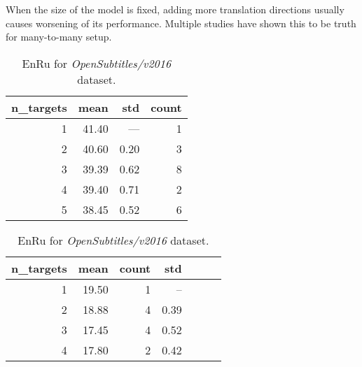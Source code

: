 When the size of the model is fixed, adding more translation directions usually causes
worsening of its performance. Multiple studies have shown this to be truth for
many-to-many setup.



\begin{table}[h!]
\begin{subtable}[t]{0.45\linewidth}
	\centering
	\begin{tabular}{rrrr}
	\toprule
	n\_targets &   mean &   std & count \\
	\midrule
	         1 &  41.40 &  ---  &   1 \\
	         2 &  40.60 &  0.20 &   3 \\
	         3 &  39.39 &  0.62 &   8 \\
	         4 &  39.40 &  0.71 &   2 \\
	         5 &  38.45 &  0.52 &   6 \\
	\bottomrule
	\end{tabular}

	\caption{
		En\to{}Bg for \emph{Europarl/v7} dataset.
		}
	\label{tab:bg/Europarl/v7}
\end{subtable}
\begin{subtable}[t]{0.45\linewidth}
	\centering
	\begin{tabular}{rrrrrrr}
	\toprule
	n\_targets & mean & count & std \\
	\midrule
	        1 &     19.50 &    1 &   --  \\
	        2 &     18.88 &    4 &  0.39 \\
	        3 &     17.45 &    4 &  0.52 \\
	        4 &     17.80 &    2 &  0.42 \\
	\bottomrule
	\end{tabular}
	
	\caption{
		En\to{}Ru for \emph{OpenSubtitles/v2016} dataset.
		}
	\label{ table:ru/OpenSubtitles/v2016 }
\end{subtable}
\end{table}



